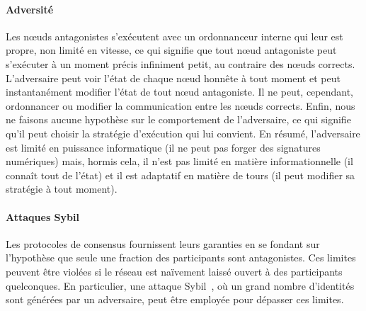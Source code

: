 \documentclass[letterpaper,twocolumn,10pt]{article}
\theoremstyle{definition}
\begin{document}
\paragraph{Adversité} %
Les nœuds antagonistes s'exécutent avec un ordonnanceur interne qui leur est propre, non limité en vitesse, ce qui signifie que tout nœud antagoniste peut s'exécuter à un moment précis infiniment petit, au contraire des nœuds corrects.
L'adversaire peut voir l'état de chaque nœud honnête à tout moment et peut instantanément modifier l'état de tout nœud antagoniste.
Il ne peut, cependant, ordonnancer ou modifier la communication entre les nœuds corrects.
Enfin, nous ne faisons aucune hypothèse sur le comportement de l'adversaire, ce qui signifie qu'il peut choisir la stratégie d'exécution qui lui convient.
En résumé, l'adversaire est limité en puissance informatique (il ne peut pas forger des signatures numériques) mais, hormis cela, il n'est pas limité en matière informationnelle (il connaît tout de l'état) et il est adaptatif en matière de tours (il peut modifier sa stratégie à tout moment).

\paragraph{Attaques Sybil}
Les protocoles de consensus fournissent leurs garanties en se fondant sur l'hypothèse que seule une fraction des participants sont antagonistes.
Ces limites peuvent être violées si le réseau est naïvement laissé ouvert à des participants quelconques.
En particulier, une attaque Sybil~\cite{douceur2002sybil}, où un grand nombre d'identités sont générées par un adversaire, peut être employée pour dépasser ces limites.
\end{document}
